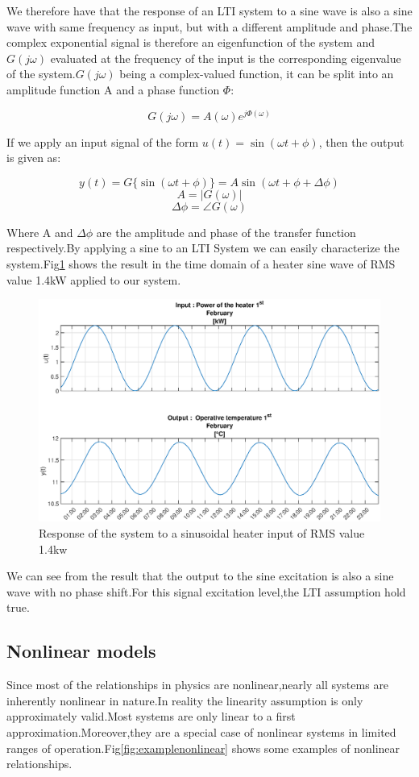 \documentclass[a4paper,12pt]{article}
\numberwithin{equation}{section}
\begin{document}
We therefore have that the response of an LTI system to a sine wave is also a sine wave  with same
frequency as input, but with a different amplitude and phase.The complex exponential signal is therefore an eigenfunction of the system and $G(j \omega)$ evaluated at the frequency of the input is the corresponding eigenvalue of the system.$G(j \omega)$ being a complex-valued function, it can be split into an amplitude function A and a phase function $\Phi$:

\[G(j \omega)=A(\omega) e^{j \Phi(\omega)}\]

If we apply an input signal of the form $u(t)=\sin (\omega t+\phi)$, then the output is given as:


\[y(t)=G\{\sin (\omega t+\phi)\} =A \sin (\omega t+\phi+\Delta \phi)\]
\[A =|G(\omega)| \]
\[\Delta \phi =\angle G(\omega)\]

Where A and $\Delta \phi$ are  the amplitude  and phase of the transfer function respectively.By applying a sine to an LTI System we can easily characterize the system.Fig\ref{fig:single sine} shows the result in the time domain of a heater sine wave of RMS value 1.4kW applied to our system.

\begin{figure}[H]
    \includegraphics[scale=0.7]{single_sine_rms_1400.eps}
    \caption{Response of the system to a sinusoidal heater input of RMS value 1.4kw}
    \label{fig:single sine}
\end{figure}

We can see from the result that the output to the sine excitation is also a sine wave with no phase shift.For this signal excitation level,the LTI assumption hold true.

\subsection{Nonlinear models}
Since most of the relationships in physics are nonlinear,nearly all systems are inherently nonlinear in nature.In reality the linearity assumption is only approximately valid.Most systems are only linear to a first approximation.Moreover,they are a special case of nonlinear systems in limited ranges of operation.Fig\ref{fig:examplenonlinear} shows some examples of nonlinear relationships.
\end{document}
